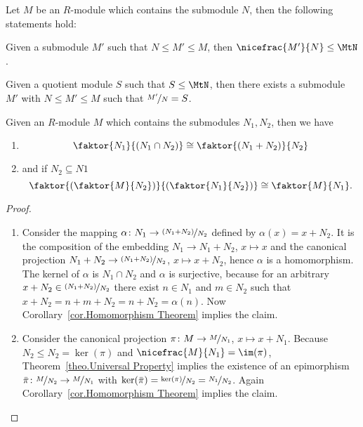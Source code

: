 \begin{cor}
Let $M$ be an $R$-module which contains the submodule $N$, then the following statements hold:
\begin{compactenum}
\item Given a submodule $M'$ such that $N\leq M'\leq M$, then $\nicefrac{M'}{N}\leq\MtN$.
\item Given a quotient module $S$ such that $S\leq\MtN$, then there exists a submodule $M'$ with $N\leq M'\leq M$ such that $\nicefrac{M'}{N}=S$.
\end{compactenum}
\end{cor}

\begin{cor}
Given an $R$-module $M$ which contains the submodules $N_1,N_2$, then we have
\begin{enumerate}
\item $$\faktor{N_1}{\left(N_1\cap N_2\right)}\cong\faktor{\left(N_1+N_2\right)}{N_2}$$
\item and if $N_2\subseteq N1$ $$\faktor{\left(\faktor{M}{N_2}\right)}{\left(\faktor{N_1}{N_2}\right)}\cong\faktor{M}{N_1}.$$
\end{enumerate}
\end{cor}
\begin{proof}
\begin{enumerate}
\item Consider the mapping $\alpha\colon N_1\to \nicefrac{\left(N_1+N_2\right)}{N_2}$ defined by $\alpha(x)=x+N_2$. It is the composition of the embedding $N_1\to N_1+N_2$, $x\mapsto x$ and the canonical projection $N_1+N_2\to\nicefrac{\left(N_1+N_2\right)}{N_2}$, $x\mapsto x+N_2$, hence $\alpha$ is a homomorphism. The kernel of $\alpha$ is $N_1\cap N_2$ and $\alpha$ is surjective, because for an arbitrary $x+N_2\in\nicefrac{\left(N_1+N_2\right)}{N_2}$ there exist $n\in N_1$ and $m\in N_2$ such that $x+N_2=n+m+N_2=n+N_2=\alpha(n)$. Now Corollary~\ref{cor.Homomorphism Theorem} implies the claim. 
\item Consider the canonical projection $\pi\colon M\to \nicefrac{M}{N_1}$, $x\mapsto x+N_1$. Because $N_2\leq N_2=\ker(\pi)$ and $\nicefrac{M}{N_1}=\im(\pi)$, Theorem~\ref{theo.Universal Property} implies the existence of an epimorphism $\bar{\pi}\colon \nicefrac{M}{N_2}\to\nicefrac{M}{N_1}$ with $\ker(\bar{\pi})=\nicefrac{\ker(\pi)}{N_2}=\nicefrac{N_1}{N_2}$. Again Corollary~\ref{cor.Homomorphism Theorem} implies the claim.
\end{enumerate}
\end{proof}